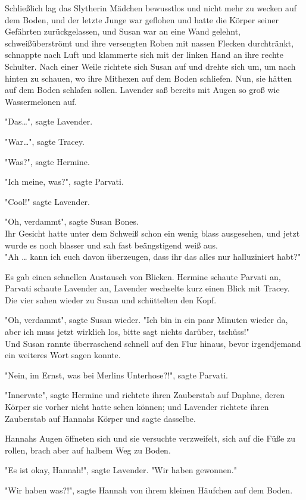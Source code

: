 {Schließlich lag das Slytherin Mädchen bewusstlos und nicht mehr zu wecken auf dem Boden, und der letzte Junge war geflohen und hatte die Körper seiner Gefährten zurückgelassen, und Susan war an eine Wand gelehnt, schweißüberströmt und ihre versengten Roben mit nassen Flecken durchtränkt, schnappte nach Luft und klammerte sich mit der linken Hand an ihre rechte Schulter. Nach einer Weile richtete sich Susan auf und drehte sich um, um nach hinten zu schauen, wo ihre Mithexen auf dem Boden schliefen. Nun, sie hätten auf dem Boden schlafen sollen. Lavender saß bereits mit Augen so groß wie Wassermelonen auf.

"Das…", sagte Lavender.

"War…", sagte Tracey.

"Was?", sagte Hermine.

"Ich meine, was?", sagte Parvati.

"Cool!" sagte Lavender.

"Oh, verdammt", sagte Susan Bones.\\ Ihr Gesicht hatte unter dem Schweiß schon ein wenig blass ausgesehen, und jetzt wurde es noch blasser und sah fast beängstigend weiß aus.\\ "Ah … kann ich euch davon überzeugen, dass ihr das alles nur halluziniert habt?"

Es gab einen schnellen Austausch von Blicken. Hermine schaute Parvati an, Parvati schaute Lavender an, Lavender wechselte kurz einen Blick mit Tracey. Die vier sahen wieder zu Susan und schüttelten den Kopf.

"Oh, verdammt", sagte Susan wieder. "Ich bin in ein paar Minuten wieder da, aber ich muss jetzt wirklich los, bitte sagt nichts darüber, tschüss!"\\ Und Susan rannte überraschend schnell auf den Flur hinaus, bevor irgendjemand ein weiteres Wort sagen konnte.

"Nein, im Ernst, was bei Merlins Unterhose?!", sagte Parvati.

"Innervate", sagte Hermine und richtete ihren Zauberstab auf Daphne, deren Körper sie vorher nicht hatte sehen können; und Lavender richtete ihren Zauberstab auf Hannahs Körper und sagte dasselbe.

Hannahs Augen öffneten sich und sie versuchte verzweifelt, sich auf die Füße zu rollen, brach aber auf halbem Weg zu Boden.

"Es ist okay, Hannah!", sagte Lavender. "Wir haben gewonnen."

"Wir haben was?!", sagte Hannah von ihrem kleinen Häufchen auf dem Boden.

}
